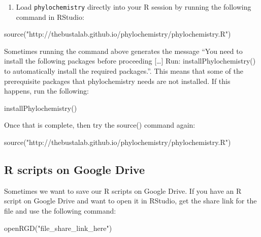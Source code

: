 \documentclass[
]{krantz}
\newenvironment{Shaded}{\begin{snugshade}}{\end{snugshade}}
\newcommand{\FunctionTok}[1]{\textcolor[rgb]{0.00,0.00,0.00}{#1}}
\newcommand{\NormalTok}[1]{#1}
\newcommand{\StringTok}[1]{\textcolor[rgb]{0.31,0.60,0.02}{#1}}
\providecommand{\tightlist}{%
  \setlength{\itemsep}{0pt}\setlength{\parskip}{0pt}}
\begin{document}
\begin{enumerate}
\def\labelenumi{\arabic{enumi}.}
\tightlist
\item
  Load \texttt{phylochemistry} directly into your R session by running the following command in RStudio:
\end{enumerate}

\begin{Shaded}
\begin{Highlighting}[]
\FunctionTok{source}\NormalTok{(}\StringTok{"http://thebustalab.github.io/phylochemistry/phylochemistry.R"}\NormalTok{)}
\end{Highlighting}
\end{Shaded}

\hfill\break
Sometimes running the command above generates the message ``You need to install the following packages before proceeding {[}\ldots{]} Run: installPhylochemistry() to automatically install the required packages.''. This means that some of the prerequisite packages that phylochemistry needs are not installed. If this happens, run the following:\\

\begin{Shaded}
\begin{Highlighting}[]
\FunctionTok{installPhylochemistry}\NormalTok{()}
\end{Highlighting}
\end{Shaded}

\hfill\break
Once that is complete, then try the source() command again:

\begin{Shaded}
\begin{Highlighting}[]
\FunctionTok{source}\NormalTok{(}\StringTok{"http://thebustalab.github.io/phylochemistry/phylochemistry.R"}\NormalTok{)}
\end{Highlighting}
\end{Shaded}

\hypertarget{r-scripts-on-google-drive}{%
\subsection{R scripts on Google Drive}\label{r-scripts-on-google-drive}}

Sometimes we want to save our R scripts on Google Drive. If you have an R script on Google Drive and want to open it in RStudio, get the share link for the file and use the following command:

\begin{Shaded}
\begin{Highlighting}[]
\FunctionTok{openRGD}\NormalTok{(}\StringTok{"file\_share\_link\_here"}\NormalTok{)}
\end{Highlighting}
\end{Shaded}
\end{document}
